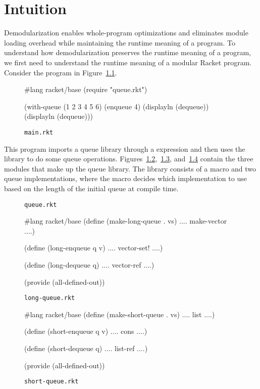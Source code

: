 \chapter{Intuition}

Demodularization enables whole-program optimizations and eliminates module loading overhead while maintaining the runtime meaning of a program.
To understand how demodularization preserves the runtime meaning of a program, we first need to understand the runtime meaning of a modular Racket program.
Consider the program in Figure~\ref{main-rkt}.

\begin{figure}[h]
\begin{schemedisplay}
#lang racket/base
(require "queue.rkt")

(with-queue (1 2 3 4 5 6)
  (enqueue 4)
  (displayln (dequeue))
  (displayln (dequeue)))
\end{schemedisplay}
\caption{\texttt{main.rkt}}
\label{main-rkt}
\end{figure}

This program imports a queue library through a  expression and then uses the library to do some queue operations.
Figures~\ref{queue-rkt},~\ref{long-queue-rkt}, and~\ref{short-queue-rkt} contain the three modules that make up the queue library.
The library consists of a macro and two queue implementations, where the macro decides which implementation to use based on the length of the initial queue at compile time.

\begin{figure}[h]

\caption{\texttt{queue.rkt}}
\label{queue-rkt}
\end{figure}

\begin{figure}[h]
\begin{schemedisplay}
#lang racket/base
(define (make-long-queue . vs)
  .... make-vector ....)

(define (long-enqueue q v)
  .... vector-set! ....)

(define (long-dequeue q)
  .... vector-ref ....)

(provide (all-defined-out))
\end{schemedisplay}
\caption{\texttt{long-queue.rkt}}
\label{long-queue-rkt}
\end{figure}

\begin{figure}[h]
\begin{schemedisplay}
#lang racket/base
(define (make-short-queue . vs)
  .... list ....)

(define (short-enqueue q v)
  .... cons ....)

(define (short-dequeue q)
  .... list-ref ....)

(provide (all-defined-out))
\end{schemedisplay}
\caption{\texttt{short-queue.rkt}}
\label{short-queue-rkt}
\end{figure}

